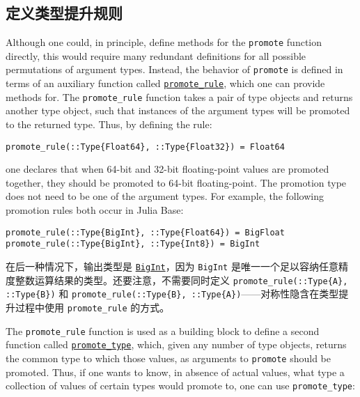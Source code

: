 \hypertarget{13578530399861722948}{}


\subsection{定义类型提升规则}



Although one could, in principle, define methods for the \texttt{promote} function directly, this would require many redundant definitions for all possible permutations of argument types. Instead, the behavior of \texttt{promote} is defined in terms of an auxiliary function called \hyperlink{16547112220540026290}{\texttt{promote\_rule}}, which one can provide methods for. The \texttt{promote\_rule} function takes a pair of type objects and returns another type object, such that instances of the argument types will be promoted to the returned type. Thus, by defining the rule:




\begin{verbatim}
promote_rule(::Type{Float64}, ::Type{Float32}) = Float64
\end{verbatim}



one declares that when 64-bit and 32-bit floating-point values are promoted together, they should be promoted to 64-bit floating-point. The promotion type does not need to be one of the argument types. For example, the following promotion rules both occur in Julia Base:




\begin{verbatim}
promote_rule(::Type{BigInt}, ::Type{Float64}) = BigFloat
promote_rule(::Type{BigInt}, ::Type{Int8}) = BigInt
\end{verbatim}



在后一种情况下，输出类型是 \hyperlink{423405808990690832}{\texttt{BigInt}}，因为 \texttt{BigInt} 是唯一一个足以容纳任意精度整数运算结果的类型。还要注意，不需要同时定义 \texttt{promote\_rule(::Type\{A\}, ::Type\{B\})} 和 \texttt{promote\_rule(::Type\{B\}, ::Type\{A\})}——对称性隐含在类型提升过程中使用 \texttt{promote\_rule} 的方式。



The \texttt{promote\_rule} function is used as a building block to define a second function called \hyperlink{15048881762587391286}{\texttt{promote\_type}}, which, given any number of type objects, returns the common type to which those values, as arguments to \texttt{promote} should be promoted. Thus, if one wants to know, in absence of actual values, what type a collection of values of certain types would promote to, one can use \texttt{promote\_type}:




